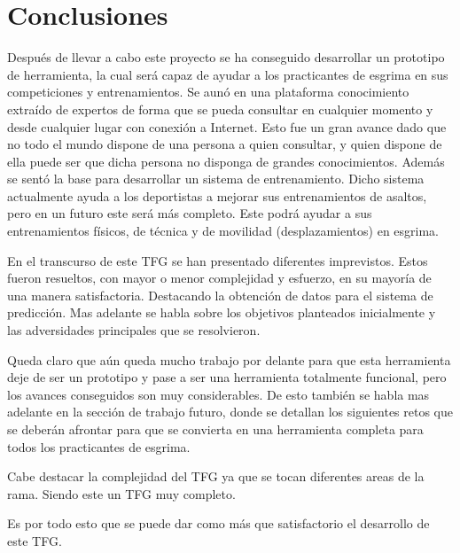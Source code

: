 \chapter{Conclusiones}
\label{cap:Conclusiones}



Después de llevar a cabo este proyecto se ha conseguido desarrollar un prototipo de herramienta,
la cual será capaz de ayudar a los practicantes de esgrima en sus competiciones y entrenamientos.
Se aunó en una plataforma conocimiento extraído de expertos de forma que se pueda consultar
en cualquier momento y desde cualquier lugar con conexión a Internet. Esto fue un gran avance
dado que no todo el mundo dispone de una persona a quien consultar, y quien dispone de ella
puede ser que dicha persona no disponga de grandes conocimientos. Además se sentó la base para
desarrollar un sistema de entrenamiento. Dicho sistema actualmente ayuda a los deportistas
a mejorar sus entrenamientos de asaltos, pero en un futuro este será más completo. Este podrá
ayudar a sus entrenamientos físicos, de técnica y de movilidad (desplazamientos) en esgrima.

En el transcurso de este \acs{TFG} se han presentado diferentes imprevistos. Estos fueron resueltos,
con mayor o menor complejidad y esfuerzo, en su mayoría de una manera satisfactoria. Destacando
la obtención de datos para el sistema de predicción. Mas adelante
se habla sobre los objetivos planteados inicialmente y las adversidades principales que se resolvieron.

Queda claro que aún queda mucho trabajo por delante para que esta herramienta deje de ser un prototipo
y pase a ser una herramienta totalmente funcional, pero los avances conseguidos son muy considerables.
De esto también se habla mas adelante en la sección de trabajo futuro, donde se detallan los siguientes
retos que se deberán afrontar para que se convierta en una herramienta completa para todos los practicantes
de esgrima.

Cabe destacar la complejidad del \acs{TFG} ya que se tocan diferentes areas de la rama. Siendo este un \acs{TFG}
muy completo.

Es por todo esto que se puede dar como más que satisfactorio el desarrollo de este \acs{TFG}.




